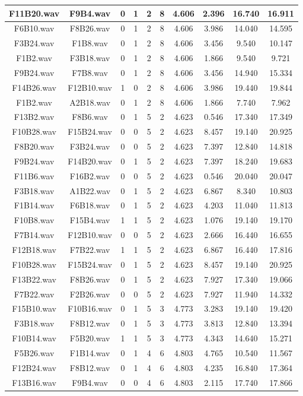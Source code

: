 \documentclass[11pt,a4paper,twoside]{book}
\begin{document}
\begin{longtable}[c]{|c|c|c|c|c|c|c|c|c|c|}
F11B20.wav&F9B4.wav&0&1&2&8&4.606&2.396&16.740&16.911\\ \hline
F6B10.wav&F8B26.wav&0&1&2&8&4.606&3.986&14.040&14.595\\ \hline
F3B24.wav&F1B8.wav&0&1&2&8&4.606&3.456&9.540&10.147\\ \hline
F1B2.wav&F3B18.wav&0&1&2&8&4.606&1.866&9.540&9.721\\ \hline
F9B24.wav&F7B8.wav&0&1&2&8&4.606&3.456&14.940&15.334\\ \hline
F14B26.wav&F12B10.wav&1&0&2&8&4.606&3.986&19.440&19.844\\ \hline
F1B2.wav&A2B18.wav&0&1&2&8&4.606&1.866&7.740&7.962\\ \hline
F13B2.wav&F8B6.wav&0&1&5&2&4.623&0.546&17.340&17.349\\ \hline
F10B28.wav&F15B24.wav&0&0&5&2&4.623&8.457&19.140&20.925\\ \hline
F8B20.wav&F3B24.wav&0&0&5&2&4.623&7.397&12.840&14.818\\ \hline
F9B24.wav&F14B20.wav&0&1&5&2&4.623&7.397&18.240&19.683\\ \hline
F11B6.wav&F16B2.wav&0&0&5&2&4.623&0.546&20.040&20.047\\ \hline
F3B18.wav&A1B22.wav&0&1&5&2&4.623&6.867&8.340&10.803\\ \hline
F1B14.wav&F6B18.wav&0&1&5&2&4.623&4.203&11.040&11.813\\ \hline
F10B8.wav&F15B4.wav&1&1&5&2&4.623&1.076&19.140&19.170\\ \hline
F7B14.wav&F12B10.wav&0&0&5&2&4.623&2.666&16.440&16.655\\ \hline
F12B18.wav&F7B22.wav&1&1&5&2&4.623&6.867&16.440&17.816\\ \hline
F10B28.wav&F15B24.wav&0&1&5&2&4.623&8.457&19.140&20.925\\ \hline
F13B22.wav&F8B26.wav&0&1&5&2&4.623&7.927&17.340&19.066\\ \hline
F7B22.wav&F2B26.wav&0&0&5&2&4.623&7.927&11.940&14.332\\ \hline
F15B10.wav&F10B16.wav&0&1&5&3&4.773&3.283&19.140&19.420\\ \hline
F3B18.wav&F8B12.wav&0&1&5&3&4.773&3.813&12.840&13.394\\ \hline
F10B14.wav&F5B20.wav&1&1&5&3&4.773&4.343&14.640&15.271\\ \hline
F5B26.wav&F1B14.wav&0&1&4&6&4.803&4.765&10.540&11.567\\ \hline
F12B24.wav&F8B12.wav&0&1&4&6&4.803&4.235&16.840&17.364\\ \hline
F13B16.wav&F9B4.wav&0&0&4&6&4.803&2.115&17.740&17.866\\ \hline

\end{longtable}
\end{document}
